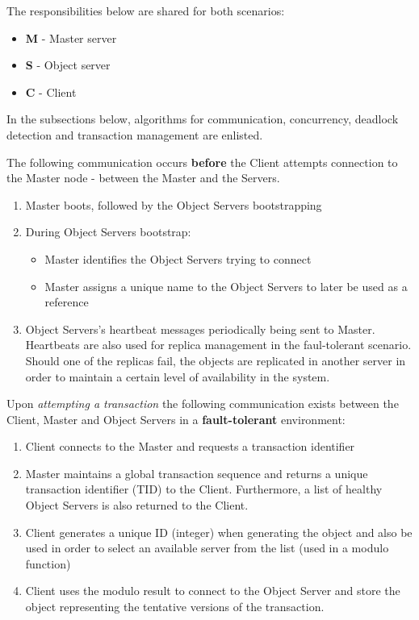 \documentclass[times, 10pt,twocolumn]{article}
\begin{document}
The responsibilities below are shared for both scenarios:
\begin{itemize}[noitemsep,nolistsep]
\item {\bf M} - Master server 
\item {\bf S} - Object server
\item {\bf C} - Client      
\end{itemize}

\label{sec:algor}
In the subsections below, algorithms for communication, concurrency, deadlock detection and transaction management are enlisted.

The following communication occurs {\bf before} the Client attempts connection to the Master node - between the Master and the Servers.

\begin{enumerate}
\item Master boots, followed by the Object Servers bootstrapping
\item During Object Servers bootstrap:
\begin{itemize}[noitemsep, nolistsep]
\item Master identifies the Object Servers trying to connect
\item Master assigns a unique name to the Object Servers to later be used as a reference
\end{itemize}
\item Object Servers's heartbeat messages periodically being sent to Master. Heartbeats are also used for replica management in the faul-tolerant scenario. Should one of the replicas fail, the objects are replicated in another server in order to maintain a certain level of availability in the system.
\end{enumerate}

Upon {\it attempting a transaction} the following communication exists between the Client, Master and Object Servers in a {\bf fault-tolerant} environment: 
\begin{enumerate}
\item Client connects to the Master and requests a transaction identifier 
\item Master maintains a global transaction sequence and returns a unique transaction identifier (TID) to the Client. Furthermore, a list of healthy Object Servers is also returned to the Client. 
\item Client generates a unique ID (integer) when generating the object and also be used in order to select an available server from the list (used in a modulo function)
\item Client uses the modulo result to connect to the Object Server and store the object representing the tentative versions of the transaction.
\end{enumerate}
\end{document}
